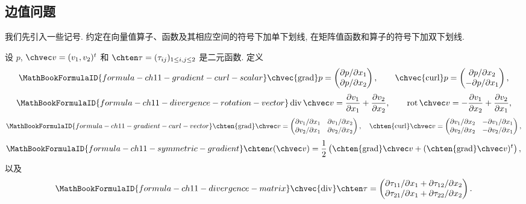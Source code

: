 \subsection{边值问题}
\label{sec:ch11-boundary-value-problems}
\setcounter{thmcount}{0}
\setcounter{equation}{0}

我们先引入一些记号. 约定在向量值算子、函数及其相应空间的符号下加单下划线, 在矩阵值函数和算子的符号下加双下划线.

设 $p$, $\chvec v=(v_1,v_2)^t$ 和 $\chten\tau=(\tau_{ij})_{1\leq i,j\leq2}$ 是二元函数. 定义
\[
\MathBookFormulaID{formula-ch11-gradient-curl-scalar}
\chvec{\operatorname{grad}}p=
\begin{pmatrix}\partial p/\partial x_1\\ \partial p/\partial x_2\end{pmatrix},
\qquad
\chvec{\operatorname{curl}}p=
\begin{pmatrix}\partial p/\partial x_2\\ -\partial p/\partial x_1\end{pmatrix},
\]
\[
\MathBookFormulaID{formula-ch11-divergence-rotation-vector}
\operatorname{div}\chvec v=\frac{\partial v_1}{\partial x_1}+\frac{\partial v_2}{\partial x_2},
\qquad
\operatorname{rot}\chvec v=-\frac{\partial v_1}{\partial x_2}+\frac{\partial v_2}{\partial x_1},
\]
\[
\MathBookFormulaID{formula-ch11-gradient-curl-vector}
\chten{\operatorname{grad}}\chvec v=
\begin{pmatrix}
\partial v_1/\partial x_1&\partial v_1/\partial x_2\\
\partial v_2/\partial x_1&\partial v_2/\partial x_2
\end{pmatrix},
\quad
\chten{\operatorname{curl}}\chvec v=
\begin{pmatrix}
\partial v_1/\partial x_2&-\partial v_1/\partial x_1\\
\partial v_2/\partial x_2&-\partial v_2/\partial x_1
\end{pmatrix},
\]
\[
\MathBookFormulaID{formula-ch11-symmetric-gradient}
\chten\epsilon(\chvec v)=\frac12\left(\chten{\operatorname{grad}}\chvec v+
(\chten{\operatorname{grad}}\chvec v)^t\right),
\]
以及
\[
\MathBookFormulaID{formula-ch11-divergence-matrix}
\chvec{\operatorname{div}}\chten\tau=
\begin{pmatrix}
\partial\tau_{11}/\partial x_1+\partial\tau_{12}/\partial x_2\\
\partial\tau_{21}/\partial x_1+\partial\tau_{22}/\partial x_2
\end{pmatrix}.
\]

